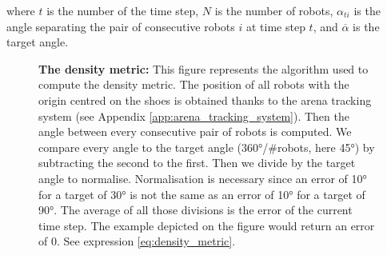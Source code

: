 \documentclass[oneside, a4paper, 12pt]{memoir}
\newcommand{\human}[3][0] %
{
	\draw [very thick, fill=white, rotate around={#1:(#2,#3)}] (#2-1,#3+0.5) ellipse (0.25cm and 0.5cm);
	\draw [very thick, fill=white, rotate around={#1:(#2,#3)}] (#2+1,#3+0.5) ellipse (0.25cm and 0.5cm);
	\draw [very thick, fill=white, rotate around={#1:(#2,#3)}] (#2,#3) ellipse (1.5cm and 0.75cm);
	\draw [thick, fill=white, rotate around={#1:(#2,#3)}] (#2-0.05,#3+1) -- (#2,#3+1.1) -- (#2+0.05,#3+1);
	\draw [very thick, fill=white, rotate around={#1:(#2,#3)}] (#2,#3+0.5) circle [radius=0.5cm];
}
\let\oldCaption\caption
\renewcommand{\caption}[2]{
\oldCaption[#1]{{\small\sffamily\bfseries #1:} #2}
}
\begin{document}
					where $t$ is the number of the time step, $N$ is the number of robots, $\alpha_{ti}$ is the angle separating the pair of consecutive robots $i$ at time step $t$, and $\overline{\alpha}$ is the target angle.
					
					\begin{figure}[!htp]\centering
						
						\caption{The density metric}{This figure represents the algorithm used to compute the density metric. The position of all robots with the origin centred on the shoes is obtained thanks to the arena tracking system (see Appendix \ref{app:arena_tracking_system}). Then the angle between every consecutive pair of robots is computed. We compare every angle to the target angle (360°/\#robots, here 45°) by subtracting the second to the first. Then we divide by the target angle to normalise. Normalisation is necessary since an error of 10° for a target of 30° is not the same as an error of 10° for a target of 90°. The average of all those divisions is the error of the current time step. The example depicted on the figure would return an error of 0. See expression \ref{eq:density_metric}.}
						\label{fig:density_metric}
					\end{figure}
					
\end{document}
